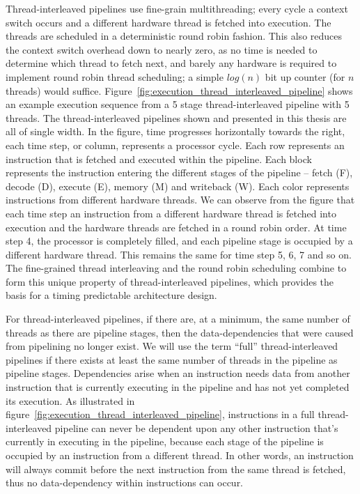 Thread-interleaved pipelines use fine-grain multithreading; every cycle a context switch occurs and a different hardware thread is fetched into execution. 
The threads are scheduled in a deterministic round robin fashion. 
This also reduces the context switch overhead down to nearly zero, as no time is needed to determine which thread to fetch next, and barely any hardware is required to implement round robin thread scheduling; a simple $log(n)$ bit up counter (for $n$ threads) would suffice.         
Figure~\ref{fig:execution_thread_interleaved_pipeline} shows an example execution sequence from a 5 stage thread-interleaved pipeline with 5 threads.
The thread-interleaved pipelines shown and presented in this thesis are all of single width.
In the figure, time progresses horizontally towards the right, each time step, or column, represents a processor cycle.
Each row represents an instruction that is fetched and executed within the pipeline.
Each block represents the instruction entering the different stages of the pipeline -- fetch (F), decode (D), execute (E), memory (M) and writeback (W).   
Each color represents instructions from different hardware threads.
We can observe from the figure that each time step an instruction from a different hardware thread is fetched into execution and the hardware threads are fetched in a round robin order.
At time step 4, the processor is completely filled, and each pipeline stage is occupied by a different hardware thread.
This remains the same for time step 5, 6, 7 and so on. 
The fine-grained thread interleaving and the round robin scheduling combine to form this unique property of thread-interleaved pipelines, which provides the basis for a timing predictable architecture design.

For thread-interleaved pipelines, if there are, at a minimum, the same number of threads as there are pipeline stages, then the data-dependencies that were caused from pipelining no longer exist. 
We will use the term ``full'' thread-interleaved pipelines if there exists at least the same number of threads in the pipeline as pipeline stages.  
Dependencies arise when an instruction needs data from another instruction that is currently executing in the pipeline and has not yet completed its execution.
As illustrated in figure~\ref{fig:execution_thread_interleaved_pipeline}, instructions in a full thread-interleaved pipeline can never be dependent upon any other instruction that's currently in executing in the pipeline, because each stage of the pipeline is occupied by an instruction from a different thread.
In other words, an instruction will always commit before the next instruction from the same thread is fetched, thus no data-dependency within instructions can occur. 


